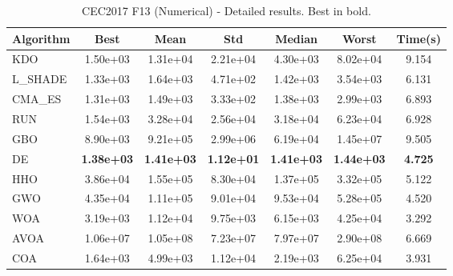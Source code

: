 \begin{table}[H]
\centering\small
\caption{CEC2017 F13 (Numerical) - Detailed results. Best in bold.}
\label{tab:cec2017_F13}
\begin{tabular}{lcccccc}
\toprule
\textbf{Algorithm} & \textbf{Best} & \textbf{Mean} & \textbf{Std} & \textbf{Median} & \textbf{Worst} & \textbf{Time(s)} \\
\midrule
KDO & 1.50e+03 & 1.31e+04 & 2.21e+04 & 4.30e+03 & 8.02e+04 & 9.154 \\
L_SHADE & 1.33e+03 & 1.64e+03 & 4.71e+02 & 1.42e+03 & 3.54e+03 & 6.131 \\
CMA_ES & 1.31e+03 & 1.49e+03 & 3.33e+02 & 1.38e+03 & 2.99e+03 & 6.893 \\
RUN & 1.54e+03 & 3.28e+04 & 2.56e+04 & 3.18e+04 & 6.23e+04 & 6.928 \\
GBO & 8.90e+03 & 9.21e+05 & 2.99e+06 & 6.19e+04 & 1.45e+07 & 9.505 \\
DE & \textbf{1.38e+03} & \textbf{1.41e+03} & \textbf{1.12e+01} & \textbf{1.41e+03} & \textbf{1.44e+03} & \textbf{4.725} \\
HHO & 3.86e+04 & 1.55e+05 & 8.30e+04 & 1.37e+05 & 3.32e+05 & 5.122 \\
GWO & 4.35e+04 & 1.11e+05 & 9.01e+04 & 9.53e+04 & 5.28e+05 & 4.520 \\
WOA & 3.19e+03 & 1.12e+04 & 9.75e+03 & 6.15e+03 & 4.25e+04 & 3.292 \\
AVOA & 1.06e+07 & 1.05e+08 & 7.23e+07 & 7.97e+07 & 2.90e+08 & 6.669 \\
COA & 1.64e+03 & 4.99e+03 & 1.12e+04 & 2.19e+03 & 6.25e+04 & 3.931 \\
\bottomrule
\end{tabular}
\end{table}
